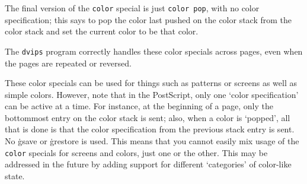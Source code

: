 The final version of the {\tt color} special is just {\tt color pop},
with no color specification; this says to pop the color last pushed
on the color stack from the color stack and set the current color to
be that color.

The {\tt dvips} program correctly handles these color specials
across pages, even when the pages are repeated or reversed.

These color specials can be used for things such as patterns or
screens as well as simple colors.  However, note that in the
PostScript, only one `color specification' can be active at a
time.  For instance, at the beginning of a page, only the
bottommost entry on the color stack is sent; also, when a color
is `popped', all that is done is that the color specification
from the previous stack entry is sent.  No \.{gsave} or \.{grestore}
is used.  This means that you cannot easily mix usage of the 
{\tt color} specials for screens and colors, just one or the other.
This may be addressed in the future by adding support for
different `categories' of color-like state.

\bye
